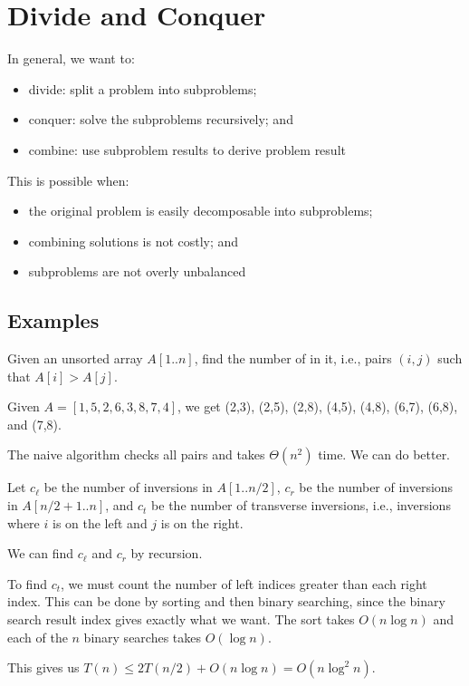 \chapter{Divide and Conquer}
In general, we want to:
\begin{itemize}[nosep]
  \item divide: split a problem into subproblems;
  \item conquer: solve the subproblems recursively; and
  \item combine: use subproblem results to derive problem result
\end{itemize}
This is possible when:
\begin{itemize}[nosep]
  \item the original problem is easily decomposable into subproblems;
  \item combining solutions is not costly; and
  \item subproblems are not overly unbalanced
\end{itemize}

\section{Examples}
\begin{problem}
  Given an unsorted array $A[1..n]$, find the number of  in it,
  i.e., pairs $(i,j)$ such that $A[i] > A[j]$.
\end{problem}
\begin{example}
  Given $A = [1,5,2,6,3,8,7,4]$,
  we get (2,3), (2,5), (2,8), (4,5), (4,8), (6,7), (6,8), and (7,8).
\end{example}
The naive algorithm checks all pairs and takes $\Theta(n^2)$ time.
We can do better.

Let $c_\ell$ be the number of inversions in $A[1..n/2]$,
$c_r$ be the number of inversions in $A[n/2+1..n]$,
and $c_t$ be the number of transverse inversions, i.e.,
inversions where $i$ is on the left and $j$ is on the right.

We can find $c_\ell$ and $c_r$ by recursion.

To find $c_t$, we must count the number of left indices
greater than each right index.
This can be done by sorting and then binary searching,
since the binary search result index gives exactly what we want.
The sort takes $O(n\log n)$ and each of the $n$ binary searches takes $O(\log n)$.

This gives us $T(n) \leq 2T(n/2) + O(n\log n) = O(n\log^2 n)$.

